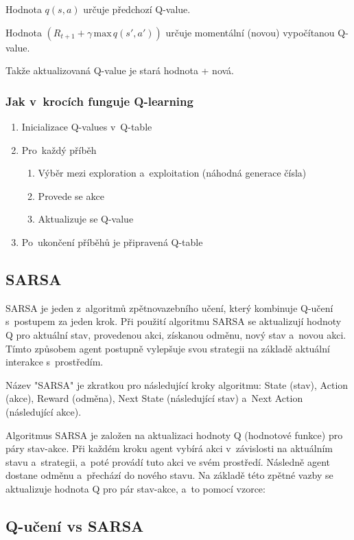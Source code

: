 Hodnota $q(s,a)$ určuje předchozí Q-value.

Hodnota $\left(R_{t+1} + \gamma\,\text{max}\,q(s',a')\right)$ určuje momentální (novou) vypočítanou Q-value.

Takže aktualizovaná Q-value je stará hodnota + nová.

\subsubsection{Jak v~krocích funguje Q-learning}

\begin{enumerate}
    \item Inicializace Q-values v~Q-table
    \item Pro~každý příběh
          \begin{enumerate}
              \item Výběr mezi exploration a~exploitation (náhodná generace čísla)
              \item Provede se akce
              \item Aktualizuje se Q-value
          \end{enumerate}
    \item Po~ukončení příběhů je připravená Q-table
\end{enumerate}

\subsection{SARSA}

SARSA je jeden z~algoritmů zpětnovazebního učení, který kombinuje Q-učení s~postupem za jeden krok. Při použití algoritmu SARSA se aktualizují hodnoty Q pro aktuální stav, provedenou akci, získanou odměnu, nový stav a~novou akci. Tímto způsobem agent postupně vylepšuje svou strategii na základě aktuální interakce s~prostředím.

Název "SARSA" je zkratkou pro následující kroky algoritmu: State (stav), Action (akce), Reward (odměna), Next State (následující stav) a~Next Action (následující akce).

Algoritmus SARSA je založen na aktualizaci hodnoty Q (hodnotové funkce) pro páry stav-akce. Při každém kroku agent vybírá akci v~závislosti na aktuálním stavu a~strategii, a~poté provádí tuto akci ve svém prostředí. Následně agent dostane odměnu a~přechází do nového stavu. Na základě této zpětné vazby se aktualizuje hodnota Q pro pár stav-akce, a~to pomocí vzorce:

\subsection{Q-učení vs SARSA}

